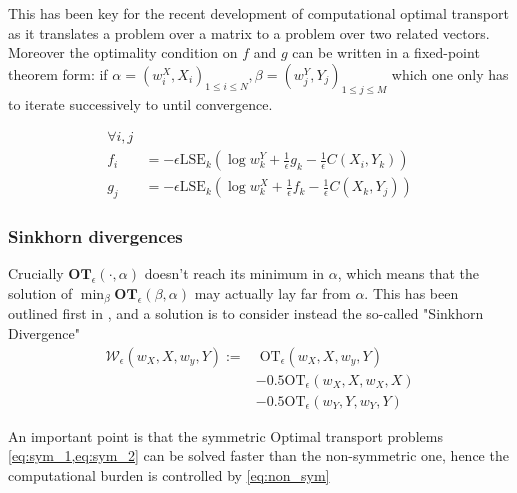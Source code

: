 \documentclass[]{article}
\begin{document}
			This has been key for the recent development of computational optimal transport \parencite{peyr2018computational} as it translates a problem over a matrix to a problem over two related vectors. Moreover the optimality condition on $f$ and $g$ can be written in a fixed-point theorem form: if $\alpha = (w^X_i, X_i)_{1 \leq i \leq N}, \beta = (w^Y_j, Y_j)_{1 \leq j \leq M}$ \parencite{feydy:interpolating} which one only has to iterate successively to until convergence.
			
			\begin{align}
				\forall i, j &\nonumber\\
				f_i &= -\epsilon \text{LSE}_k(\log w^Y_k + \frac 1 \epsilon g_k - \frac 1 \epsilon C(X_i, Y_k)) \label{eq:fixed_1}\\
				g_j &= -\epsilon \text{LSE}_k(\log w^X_k + \frac 1 \epsilon f_k - \frac 1 \epsilon C(X_k, Y_j)) \label{eq:fixed_2}
			\end{align}
			
	
		\subsubsection{Sinkhorn divergences}
			\label{subsubsec:Div}
			Crucially $\textbf{OT}_{\epsilon}(\cdot, \alpha)$ doesn't reach its minimum in $\alpha$, which means that the solution of $\min_{\beta} \textbf{OT}_{\epsilon}(\beta, \alpha)$ may actually lay far from $\alpha$. This has been outlined first in \cite{genevay2017learning}, and a solution is to consider instead the so-called "Sinkhorn Divergence" 
			\begin{align}
				\mathcal{W}_\epsilon(w_X, X, w_y, Y) := 
					& \; \text{OT}_{\epsilon}(w_X, X, w_y, Y) \label{eq:non_sym}\\
					& - 0.5 \text{OT}_{\epsilon}(w_X, X, w_X, X) \label{eq:sym_1}\\
					& - 0.5 \text{OT}_{\epsilon}(w_Y, Y, w_Y, Y)\label{eq:sym_2}
			\end{align}
			
			An important point is that the symmetric Optimal transport problems \cref{eq:sym_1,eq:sym_2} can be solved faster than the non-symmetric one, hence the computational burden is controlled by \cref{eq:non_sym}
\end{document}
